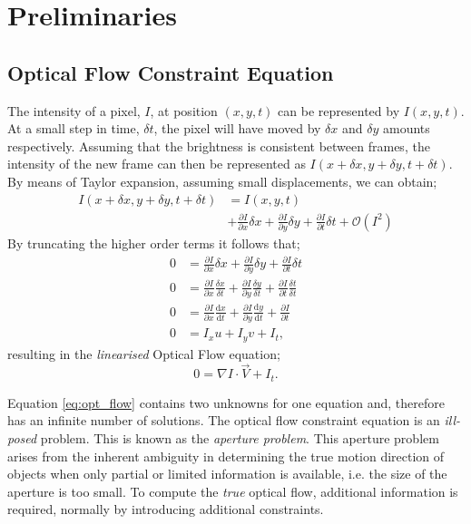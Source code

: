 \section{Preliminaries}\label{section:prelim}

\subsection{Optical Flow Constraint Equation}

\IEEEPARstart{}{}The intensity of a pixel, $I$, at position $(x, y, t)$ can be represented by $I(x, y, t)$. At a small step in time, $\delta t$, the pixel will have moved by $\delta x$ and $\delta y$ amounts respectively. Assuming that the brightness is consistent between frames, the intensity of the new frame can then be represented as $I(x+\delta x, y + \delta y, t + \delta t)$. By means of Taylor expansion, assuming small displacements, we can obtain;
\begin{align*}
	I(x+\delta x, y + \delta y, t + \delta t) &= I(x, y, t) \\ &+ \frac{\partial I}{\partial x} \delta x + \frac{\partial I}{\partial y} \delta y + \frac{\partial I}{\partial t} \delta t + \mathcal{O}(I^2 )
\end{align*}
By truncating the higher order terms it follows that;
\begin{align*}
	0 &= \frac{\partial I}{\partial x} \delta x + \frac{\partial I}{\partial y} \delta y + \frac{\partial I}{\partial t} \delta t  \\
	0 &= \frac{\partial I}{\partial x} \frac{\delta x}{\delta t} + \frac{\partial I}{\partial y} \frac{\delta y}{\delta t} + \frac{\partial I}{\partial t} \frac{\delta t}{\delta t} \\
	0 &= \frac{\partial I}{\partial x} \frac{\mathrm{d}x}{\mathrm{d} t} + \frac{\partial I}{\partial y} \frac{\mathrm{d} y}{\mathrm{d} t} + \frac{\partial I}{\partial t} \\
	0 &= I_x u + I_y v + I_t,
\end{align*}
resulting in the \textit{linearised} Optical Flow equation;
\begin{equation} \label{eq:opt_flow}
	0 = \nabla I \cdot \vec{V} + I_t. 
\end{equation}

\IEEEPARstart{}{} Equation \ref{eq:opt_flow} contains two unknowns for one equation and, therefore has an infinite number of solutions. The optical flow constraint equation is an \textit{ill-posed} problem. This is known as the \textit{aperture problem}. This aperture problem arises from the inherent ambiguity in determining the true motion direction of objects when only partial or limited information is available, i.e. the size of the aperture is too small. To compute the \textit{true} optical flow, additional information is required, normally by introducing additional constraints.

